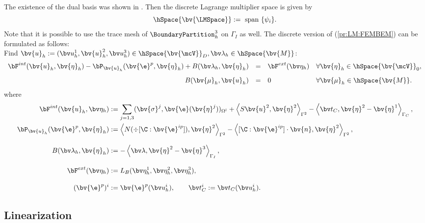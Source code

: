 The existence of the dual basis was shown in \cite{W00}. Then the discrete Lagrange multiplier space is given by
\[
\hSpace{\bv{\LMSpace}} := \mbox{ span } \{ \psi_i \}.
\]
Note that it is possible to use the trace mesh of $\BoundaryPartition^3_h$ on $\Gamma_I$ as well.
The discrete version of (\ref{pr:LM:FEMBEM}) can be formulated as follows: \\
Find $\bv{u}_{h} := (\bv u^1_h, \bv{u}^2_h, \bv u^3_h) \in \hSpace{\bv{\mcV}}_D, \bv \lambda_h \in \hSpace{\bv{M}}$:
\begin{equation}  \label{Discr_sadpt}
\begin{array}{rcll}
  \bF^{int}(\bv{u}_{h},\bv{\eta}_h) 
- \bP_{\bv{u}_{h}} ( \bv{\e}^p,\bv{\eta}_h) 
+ B(\bv \lambda_h, \bv{\eta}_h) 
&=& \bF^{ext}(\bv\eta_h)
&\forall \bv{\eta}_h \in \hSpace{\bv{\mcV}}_0, \\[2ex]
B(\bv{\mu}_h, \bv{u}_{h}) 
&=& 0
&\forall \bv{\mu}_h \in \hSpace{\bv{M}}.
\end{array}
\end{equation}
where
\begin{align*}
\bF^{int}(\bv{u}_{h},\bv\eta_h) &:= 
\sum \limits_{j=1,3} 
   (\bv{\sigma}^j,\bv{\e}(\bv{\eta}^j))_{\Omega^l}
+ \left\langle S \bv{u}^2, \bv{\eta}^2 \right\rangle_{\Gamma^2}
 - \left\langle \bv t_C, \bv{\eta}^2 - \bv{\eta}^1 \right\rangle_{\Gamma_C},  \\
\bP_{\bv{u}_{h}} ( \bv{\e}^p,\bv{\eta}_h) &:= 
  \left\langle N (\div [\C : \bv{\e}^{ip}]) , \bv{\eta}^2 \right\rangle_{\Gamma^2}
- \left\langle [\C : \bv{\e}^{ip}] \cdot \bv{n}, \bv{\eta}^2\right\rangle_{\Gamma^2}, \\[2ex]
B(\bv \lambda_h, \bv{\eta}_h) &:= 
 - \left\langle \bv \lambda, \bv{\eta}^2 - \bv{\eta}^3 \right\rangle_{\Gamma_I}, \\[2ex]
\bF^{ext}(\bv\eta_h) &:= L_B (\bv\eta^1_h,\bv\eta^2_h,\bv\eta^3_h), \\[2ex]
(\bv{\e}^p)^i &:= \bv{\e}^p(\bv u^i_h), \qquad \bv t_C^i := \bv t_C(\bv u^i_h).
\end{align*}

\subsection{Linearization} \label{sec:lin}

